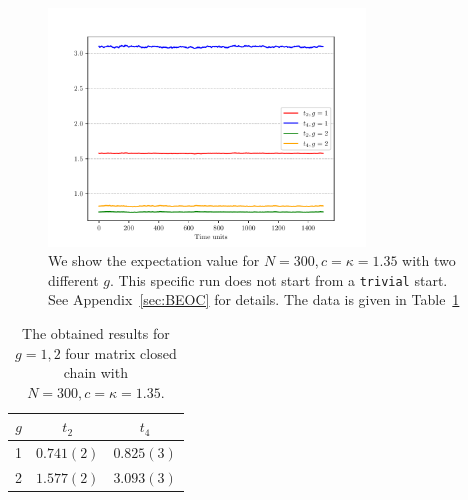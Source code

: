 \documentclass[11pt]{article}
\begin{document}
\begin{figure}[htbp] 
	\centering 
	\includegraphics[width=0.75\textwidth]{figs/4MM_g1_g2.pdf}
\caption{\label{fig:4MM_closed1} We show the expectation value for $N=300, c=\kappa=1.35$ with two different $g$. This specific run does not start from a \texttt{trivial} start. See Appendix~\ref{sec:BEOC} for details. The data is given in Table~\ref{table:4mchain_data}}
\end{figure}

\begin{table}[h!]
	\centering
	\begin{tabular}{||c c c||} 
		\hline
		$g$ & $ t_2 $ & $t_4 $ \\ [0.5ex] 
		\hline\hline
		1 & $ 0.741(2)$ & $0.825(3) $  \\ 
		2 & $ 1.577(2) $ & $3.093(3)$
		\\ [1ex] 
		\hline 
	\end{tabular}
	\caption{The obtained results for $g=1,2$ four matrix closed chain with $N=300, c=\kappa=1.35$.}
	\label{table:4mchain_data}
\end{table}


\end{document}
